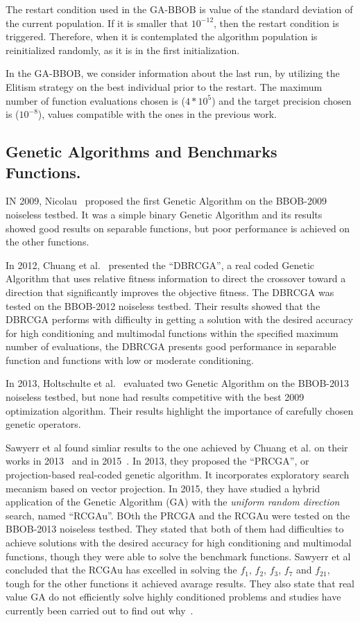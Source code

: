 The restart condition used in the GA-BBOB is value of the standard deviation of the current population. If it is smaller that $10^{-12}$, then the restart condition is triggered. Therefore, when it is contemplated the algorithm population is reinitialized randomly, as it is in the first initialization. 

In the GA-BBOB, we consider information about the last run, by utilizing the Elitism strategy on the best individual prior to the restart. The maximum number of function evaluations chosen is ($4 * 10^5$) and the target precision chosen is ($10^{-8}$), values compatible with the ones in the previous work.

\subsection{Genetic Algorithms and Benchmarks Functions.}

IN 2009, Nicolau~\cite{nicolau2009application} proposed the first Genetic Algorithm on the BBOB-2009 noiseless testbed. It was a simple binary Genetic Algorithm and its results showed good results on separable functions, but poor performance is achieved on the other functions.

In 2012, Chuang et al.~\cite{chuang2012black} presented the ``DBRCGA'', a real coded Genetic Algorithm that uses relative fitness information to direct the crossover toward a direction that significantly improves the objective fitness. The DBRCGA was tested on the BBOB-2012 noiseless testbed. Their results showed that the DBRCGA performs with difficulty in getting a solution with the desired accuracy for high conditioning and multimodal functions within the specified maximum number of evaluations, the DBRCGA presents good performance in separable function and functions with low or moderate conditioning.

In 2013, Holtschulte et al.~\cite{holtschulte2013benchmarking} evaluated two Genetic Algorithm on the BBOB-2013 noiseless testbed, but none had results competitive with the best 2009 optimization algorithm. Their results highlight the importance of carefully chosen genetic operators.

Sawyerr et al found simliar results to the one achieved by Chuang et al. on their works in 2013~\cite{sawyerr2013benchmarking} and in 2015~\cite{sawyerr2015benchmarking}. In 2013, they proposed the ``PRCGA'', or projection-based real-coded genetic algorithm. It incorporates exploratory search mecanism based on vector projection. In 2015, they have studied a hybrid application of the Genetic Algorithm (GA) with the \textit{uniform random direction} search, named ``RCGAu''. BOth the PRCGA and the RCGAu were tested on the BBOB-2013 noiseless testbed. They stated that both of them had difficulties to achieve solutions with the desired accuracy for high conditioning and multimodal functions, though they were able to solve the benchmark functions.  Sawyerr et al concluded that the RCGAu has excelled in solving the $f_1$, $f_2$, $f_3$, $f_7$ and $f_{21}$, tough for the other functions it achieved avarage results. They also state that real value GA do not efficiently solve highly conditioned problems and studies have currently been carried out to find out why~\cite{sawyerr2015benchmarking}.
